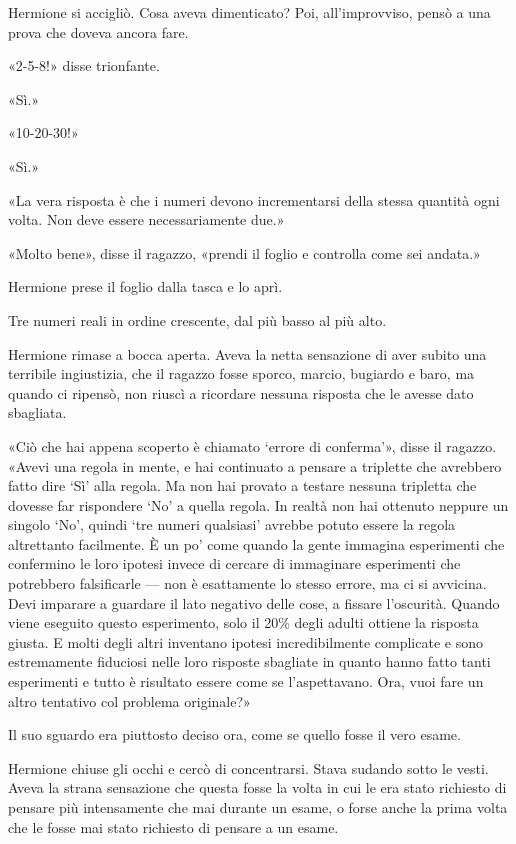 Hermione si accigliò. Cosa aveva dimenticato? Poi, all’improvviso, pensò a una prova che doveva ancora fare.

«2-5-8!» disse trionfante.

«Sì.»

«10-20-30!»

«Sì.»

«La vera risposta è che i numeri devono incrementarsi della stessa quantità ogni volta. Non deve essere necessariamente due.»

«Molto bene», disse il ragazzo, «prendi il foglio e controlla come sei andata.»

Hermione prese il foglio dalla tasca e lo aprì.

Tre numeri reali in ordine crescente, dal più basso al più alto.

Hermione rimase a bocca aperta. Aveva la netta sensazione di aver subito una terribile ingiustizia, che il ragazzo fosse sporco, marcio, bugiardo e baro, ma quando ci ripensò, non riuscì a ricordare nessuna risposta che le avesse dato sbagliata.

«Ciò che hai appena scoperto è chiamato ‘errore di conferma’», disse il ragazzo. «Avevi una regola in mente, e hai continuato a pensare a triplette che avrebbero fatto dire ‘Sì’ alla regola. Ma non hai provato a testare nessuna tripletta che dovesse far rispondere ‘No’ a quella regola. In realtà non hai ottenuto neppure un singolo ‘No’, quindi ‘tre numeri qualsiasi’ avrebbe potuto essere la regola altrettanto facilmente. È un po’ come quando la gente immagina esperimenti che confermino le loro ipotesi invece di cercare di immaginare esperimenti che potrebbero falsificarle — non è esattamente lo stesso errore, ma ci si avvicina. Devi imparare a guardare il lato negativo delle cose, a fissare l’oscurità. Quando viene eseguito questo esperimento, solo il 20\% degli adulti ottiene la risposta giusta. E molti degli altri inventano ipotesi incredibilmente complicate e sono estremamente fiduciosi nelle loro risposte sbagliate in quanto hanno fatto tanti esperimenti e tutto è risultato essere come se l’aspettavano. Ora, vuoi fare un altro tentativo col problema originale?»

Il suo sguardo era piuttosto deciso ora, come se quello fosse il vero esame.

Hermione chiuse gli occhi e cercò di concentrarsi. Stava sudando sotto le vesti. Aveva la strana sensazione che questa fosse la volta in cui le era stato richiesto di pensare più intensamente che mai durante un esame, o forse anche la prima volta che le fosse mai stato richiesto di pensare a un esame.

